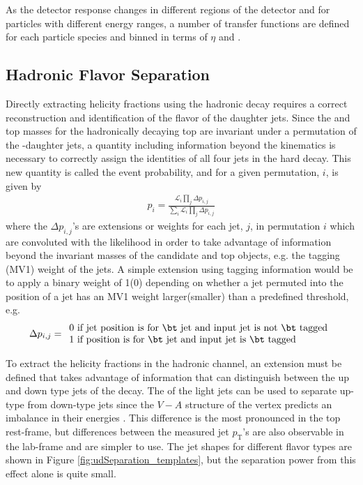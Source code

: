 As the detector response changes in different regions of the detector and for particles with different energy ranges, a number of transfer functions are defined for each particle species and binned in terms of $\eta$ and \pt.  %

\subsection{Hadronic Flavor Separation} 
\label{sec:udSep}
Directly extracting helicity fractions using the hadronic \w decay requires a correct reconstruction and identification of the flavor of the daughter jets. Since the \w and top masses for the hadronically decaying top are invariant under a permutation of the \w-daughter jets, a quantity including information beyond the kinematics is necessary to correctly assign the identities of all four jets in the hard \ttbar decay. This new quantity is called the event probability, and for a given permutation, $i$, is given by
\begin{eqnarray}
p_{i}= \frac{\mathcal{L}_i\prod_j\Delta p_{i,j}}{\sum_i\mathcal{L}_i\prod_j\Delta p_{i,j}}
\label{eq:probExt}
\end{eqnarray}
where the $\Delta p_{i,j}$'s are extensions or weights for each jet, $j$, in permutation $i$ which are convoluted with the likelihood in order to take advantage of information beyond the invariant masses of the candidate \w and top objects, e.g. the \bt tagging (MV1) weight of the jets. A simple extension using  \bt tagging information would be to apply a binary weight of 1(0) depending on whether a jet permuted into the position of a \bt jet has an MV1 weight larger(smaller) than a predefined threshold, e.g.
\begin{eqnarray}
\Delta p_{i,j}= %
\begin{array}{ll}
0 \text{  if jet position is for \bt jet and input jet is not \bt tagged}\\
1 \text{  if position is for \bt jet and input jet is \bt tagged}
\end{array}
\label{eq:bTag_pij}
\end{eqnarray}


To extract the helicity fractions in the hadronic channel, an extension must be defined that takes advantage of information that can distinguish between the up and down type jets of the \w decay. The \pt of the light jets can be used to separate up-type from down-type jets since the $V-A$ structure of the \Wtb vertex predicts an imbalance in their energies \cite{Jezabek:1994zv,Brandenburg:2002xr}. This difference is the most pronounced in the top rest-frame, but differences between the measured jet \ensuremath{p_{\text{T}}}'s are also observable in the lab-frame and are simpler to use. The jet \pt shapes for different flavor types are shown in Figure \ref{fig:udSeparation_templates}, but the separation power from this effect alone is quite small. 

